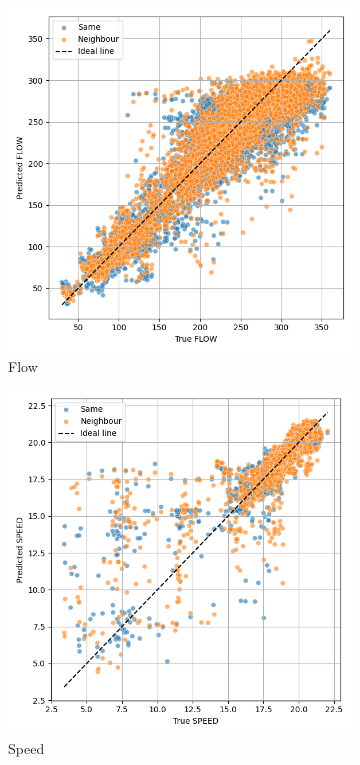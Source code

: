 	\begin{figure}[H]
		\centering
		\begin{subfigure}{0.49 \linewidth}
			\includegraphics[width=\textwidth]{../Plots/Flow/samevsneighbour}
			\caption{Flow}
		\end{subfigure}
		\begin{subfigure}{0.49 \linewidth}
			\includegraphics[width=\textwidth]{../Plots/Speed/samevsneighbour}
			\caption{Speed}
		\end{subfigure}
		\caption{}
		\label{fig:samevsneighbour}
	\end{figure}
	
